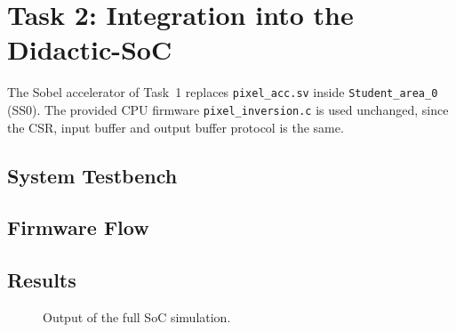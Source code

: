 \section{Task 2: Integration into the Didactic-SoC} \label{sec:task2}

The Sobel accelerator of Task~1 replaces \texttt{pixel\_acc.sv} inside \texttt{Student\_area\_0} (SS0). The provided CPU firmware \texttt{pixel\_inversion.c} is used unchanged, since the CSR, input buffer and output buffer protocol is the same.

\subsection{System Testbench}


\subsection{Firmware Flow}


\subsection{Results}


\begin{figure}[H]
    \centering
    \caption{Output of the full SoC simulation.}
    \label{fig:task2_result}
\end{figure}

